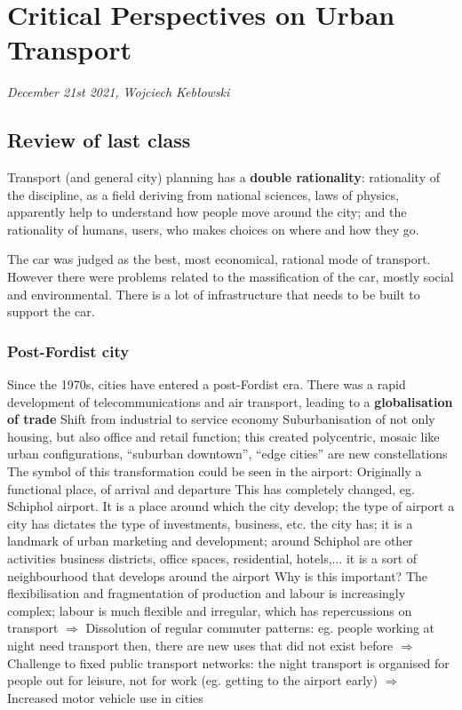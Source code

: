 \documentclass{article}
\begin{document}

\section{Critical Perspectives on Urban Transport}
\textit{December 21st 2021, Wojciech Kebłowski}

\subsection{Review of last class}

Transport (and general city) planning has a \textbf{double rationality}: rationality of the discipline, as a field deriving from national sciences, laws of physics, apparently help to understand how people move around the city; and the rationality of humans, users, who makes choices on where and how they go.

The car was judged as the best, most economical, rational mode of transport. However there were problems related to the massification of the car, mostly social and environmental. There is a lot of infrastructure that needs to be built to support the car.

\subsubsection{Post-Fordist city}

\begin{outline}
	\1 Since the 1970s, cities have entered a post-Fordist era. There was a rapid development of telecommunications and air transport, leading to a \textbf{globalisation of trade}
	\1 Shift from industrial to service economy
	\1 Suburbanisation of not only housing, but also office and retail function; this created polycentric, mosaic like urban configurations, ``suburban downtown'', ``edge cities'' are new constellations
	\1 The symbol of this transformation could be seen in the airport:
		\2 Originally a functional place, of arrival and departure
		\2 This has completely changed, eg. Schiphol airport. It is a place around which the city develop; the type of airport a city has dictates the type of investments, business, etc. the city has; it is a landmark of urban marketing and development; around Schiphol are other activities business districts, office spaces, residential, hotels,... it is a sort of neighbourhood that develops around the airport
	\1 Why is this important? The flexibilisation and fragmentation of production and labour is increasingly complex; labour is much flexible and irregular, which has repercussions on transport 
	\1 $\Rightarrow$ Dissolution of regular commuter patterns: eg. people working at night need transport then, there are new uses that did not exist before
	\1 $\Rightarrow$ Challenge to fixed public transport networks: the night transport is organised for people out for leisure, not for work (eg. getting to the airport early)
	\1 $\Rightarrow$ Increased motor vehicle use in cities
\end{outline}
\end{document}
